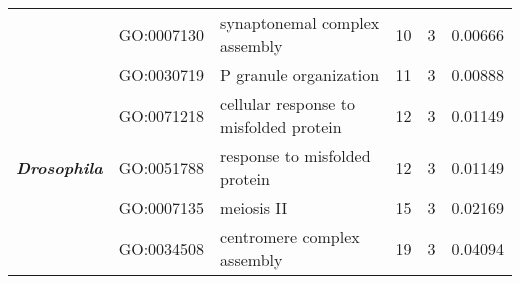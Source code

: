 \documentclass[../main.tex]{subfiles}
\begin{document}
\begin{landscape}
\begin{longtable}{@{}lllccr@{}}
		                                               & GO:0007130                         & synaptonemal complex assembly                                             & 10                                                                 & 3                                                                    & 0.00666                                                                                  \\
		\multirow{5}{*}{\textit{\textbf{Drosophila}}}  & GO:0030719                         & P granule organization                                                    & 11                                                                 & 3                                                                    & 0.00888                                                                                  \\
		                                               & GO:0071218                         & cellular response to misfolded protein                                    & 12                                                                 & 3                                                                    & 0.01149                                                                                  \\
		                                               & GO:0051788                         & response to misfolded protein                                             & 12                                                                 & 3                                                                    & 0.01149                                                                                  \\
		                                               & GO:0007135                         & meiosis II                                                                & 15                                                                 & 3                                                                    & 0.02169                                                                                  \\
		                                               & GO:0034508                         & centromere complex assembly                                               & 19                                                                 & 3                                                                    & 0.04094                                                                                  \\* \bottomrule \bottomrule
	\end{longtable}
\end{landscape}
\end{document}
